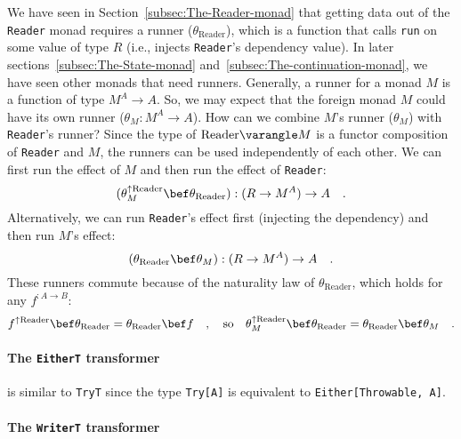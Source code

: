 We have seen in Section~\ref{subsec:The-Reader-monad} that getting
data out of the \lstinline!Reader! monad requires a runner ($\theta_{\text{Reader}}$),
which is a function that calls \lstinline!run! on some value of type
$R$ (i.e., injects \lstinline!Reader!\textsf{'}s dependency value). In later
sections~\ref{subsec:The-State-monad} and~\ref{subsec:The-continuation-monad},
we have seen other monads that need runners. Generally, a runner for
a monad $M$ is a function of type $M^{A}\rightarrow A$. So, we may
expect that the foreign monad $M$ could have its own runner ($\theta_{M}:M^{A}\rightarrow A$).
How can we combine $M$\textsf{'}s runner ($\theta_{M}$) with \lstinline!Reader!\textsf{'}s
runner? Since the type of $\text{Reader}\varangle M$ is a functor
composition of \lstinline!Reader! and $M$, the runners can be used
independently of each other. We can first run the effect of $M$ and
then run the effect of \lstinline!Reader!:
\[
(\theta_{M}^{\uparrow\text{Reader}}\bef\theta_{\text{Reader}}):(R\rightarrow M^{A})\rightarrow A\quad.
\]
Alternatively, we can run \lstinline!Reader!\textsf{'}s effect first (injecting
the dependency) and then run $M$\textsf{'}s effect:
\[
(\theta_{\text{Reader}}\bef\theta_{M}):(R\rightarrow M^{A})\rightarrow A\quad.
\]
These runners commute because of the naturality law of $\theta_{\text{Reader}}$,
which holds for any $f^{:A\rightarrow B}$:
\[
f^{\uparrow\text{Reader}}\bef\theta_{\text{Reader}}=\theta_{\text{Reader}}\bef f\quad,\quad\text{so}\quad\theta_{M}^{\uparrow\text{Reader}}\bef\theta_{\text{Reader}}=\theta_{\text{Reader}}\bef\theta_{M}\quad.
\]


\paragraph{The \texttt{EitherT} transformer}

is similar to \lstinline!TryT! since the type \lstinline!Try[A]!
is equivalent to \lstinline!Either[Throwable, A]!.

\paragraph{The \texttt{WriterT} transformer}

